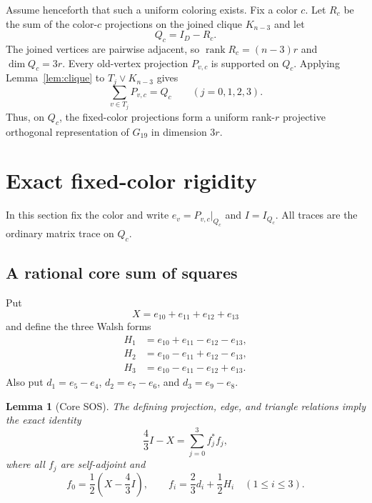 \documentclass[11pt]{article}
\newtheorem{lemma}[theorem]{Lemma}
\newcommand{\rank}{\operatorname{rank}}
\newcommand{\id}{I}
\newcommand{\join}{\mathbin{\vee}}
\begin{document}
Assume henceforth that such a uniform coloring exists.  Fix a color $c$.
Let $R_c$ be the sum of the color-$c$ projections on the joined clique
$K_{n-3}$ and let
\[
    Q_c=\id_D-R_c.
\]
The joined vertices are pairwise adjacent, so $\rank R_c=(n-3)r$ and
$\dim Q_c=3r$.  Every old-vertex projection $P_{v,c}$ is supported on $Q_c$.
Applying Lemma~\ref{lem:clique} to $T_j\join K_{n-3}$ gives
\begin{equation}\label{eq:triangles}
       \sum_{v\in T_j}P_{v,c}=Q_c
       \qquad(j=0,1,2,3).
\end{equation}
Thus, on $Q_c$, the fixed-color projections form a uniform rank-$r$
projective orthogonal representation of $G_{19}$ in dimension $3r$.

\section{Exact fixed-color rigidity}

In this section fix the color and write $e_v=P_{v,c}|_{Q_c}$ and
$I=I_{Q_c}$.  All traces are the ordinary matrix trace on $Q_c$.

\subsection{A rational core sum of squares}

Put
\[
 X=e_{10}+e_{11}+e_{12}+e_{13}
\]
and define the three Walsh forms
\begin{align*}
 H_1&=e_{10}+e_{11}-e_{12}-e_{13},\\
 H_2&=e_{10}-e_{11}+e_{12}-e_{13},\\
 H_3&=e_{10}-e_{11}-e_{12}+e_{13}.
\end{align*}
Also put $d_1=e_5-e_4$, $d_2=e_7-e_6$, and $d_3=e_9-e_8$.

\begin{lemma}[Core SOS]\label{lem:sos}
The defining projection, edge, and triangle relations imply the exact
identity
\begin{equation}\label{eq:sos}
       \frac43I-X=\sum_{j=0}^3 f_j^*f_j,
\end{equation}
where all $f_j$ are self-adjoint and
\[
 f_0=\frac12\left(X-\frac43I\right),
 \qquad
 f_i=\frac23d_i+\frac12H_i\quad(1\leq i\leq3).
\]
\end{lemma}
\end{document}
